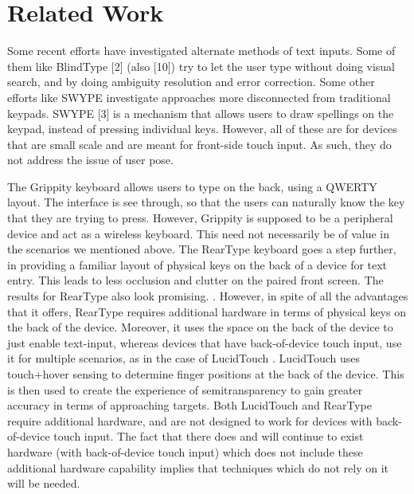 \section{Related Work}

Some recent efforts have investigated alternate methods of text inputs. Some of them like BlindType [2] (also [10]) try to let the user type without doing visual search, and by doing ambiguity resolution and error correction. Some other efforts like SWYPE investigate approaches more disconnected from traditional keypads. SWYPE [3] is a mechanism that allows users to draw spellings on the keypad, instead of pressing individual keys. However, all of these are for devices that are small scale and are meant for front-side touch input.  As such, they do not address the issue of user pose.

The Grippity keyboard  allows users to type on the back, using a QWERTY layout. The interface is see through, so that the users can naturally know the key that they are trying to press. However, Grippity is supposed to be a peripheral device and act as a wireless keyboard. This need not necessarily be of value in the scenarios we mentioned above. The RearType keyboard goes a step further, in providing a familiar layout of physical keys on the back of a device for text entry. This leads to less occlusion and clutter on the paired front screen. The results for RearType also look promising. . However, in spite of all the advantages that it offers, RearType requires additional hardware in terms of physical keys on the back of the device. Moreover, it uses the space on the back of the device to just enable text-input, whereas devices that have back-of-device touch input, use it for multiple scenarios, as in the case of LucidTouch . LucidTouch uses touch+hover sensing to determine finger positions at the back of the device. This is then used to create the experience of semitransparency to gain greater accuracy in terms of approaching targets. Both LucidTouch and RearType require additional hardware, and are not designed to work for devices with back-of-device touch input. The fact that there does and will continue to exist hardware (with back-of-device touch input) which does not include these additional hardware capability implies that techniques which do not rely on it will be needed.

